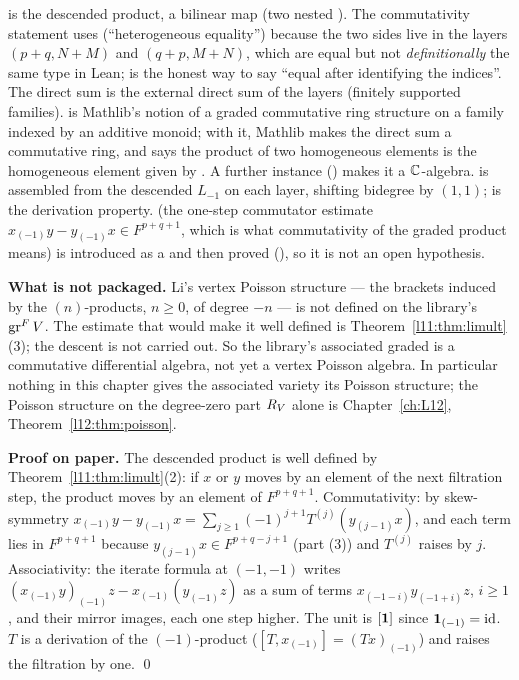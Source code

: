 \begin{dictionary}
 is the descended product, a bilinear map (two nested ). The
commutativity statement  uses  (``heterogeneous equality'') because
the two sides live in the layers $(p+q,N+M)$ and $(q+p,M+N)$, which are equal but not \emph{definitionally}
the same type in Lean;  is the honest way to say ``equal after identifying the indices''. The
direct sum  is the external direct sum of the layers (finitely supported families).
 is Mathlib's notion of a graded commutative ring structure on a family indexed by
an additive monoid; with it, Mathlib makes the direct sum a commutative ring, and
\allowbreak{}\allowbreak{}\allowbreak{} says the product of two homogeneous elements is the homogeneous element
given by . A further instance () makes it a
${\mathbb{C}}$-algebra.  is assembled from the descended $L_{-1}$ on each layer,
shifting bidegree by $(1,1)$;  is the derivation property. 
(the one-step commutator estimate $x_{(-1)}y - y_{(-1)}x\in F^{p+q+1}$, which is what commutativity of the
graded product means) is introduced as a  and then proved
(\allowbreak{}), so it is not an open hypothesis.

\textbf{What is not packaged.} Li's vertex Poisson structure --- the brackets induced by the $(n)$-products,
$n\ge0$, of degree $-n$ --- is not defined on the library's $\operatorname{gr}^FV$. The estimate that would make it
well defined is Theorem~\ref{l11:thm:limult}(3); the descent is not carried out. So the library's
associated graded is a commutative differential algebra, not yet a vertex Poisson algebra. In particular nothing in this chapter
gives the associated variety its Poisson structure; the Poisson structure on the degree-zero part $R_V$ alone is
Chapter~\ref{ch:L12}, Theorem~\ref{l12:thm:poisson}.
\end{dictionary}

\textbf{Proof on paper.} The descended product is well defined by Theorem~\ref{l11:thm:limult}(2): if $x$
or $y$ moves by an element of the next filtration step, the product moves by an element of $F^{p+q+1}$.
Commutativity: by skew-symmetry $x_{(-1)}y - y_{(-1)}x = \sum_{j\ge1}(-1)^{j+1}T^{(j)}(y_{(j-1)}x)$, and
each term lies in $F^{p+q+1}$ because $y_{(j-1)}x\in F^{p+q-j+1}$ (part (3)) and $T^{(j)}$ raises by $j$.
Associativity: the iterate formula at $(-1,-1)$ writes $(x_{(-1)}y)_{(-1)}z - x_{(-1)}(y_{(-1)}z)$ as a
sum of terms $x_{(-1-i)}y_{(-1+i)}z$, $i\ge1$, and their mirror images, each one step higher. The unit is
$[\mathbf{1}]$ since $\mathbf{1}_{(-1)} = \mathrm{id}$. $T$ is a derivation of the $(-1)$-product
($[T,x_{(-1)}] = (Tx)_{(-1)}$) and raises the filtration by one. \qed

